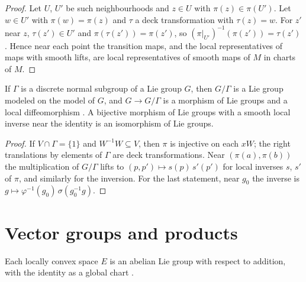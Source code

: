 \begin{proof}
  \leanok
  Let $U$, $U'$ be such neighbourhoods and $z \in U$ with $\pi(z) \in \pi(U')$. Let $w \in U'$ with
  $\pi(w) = \pi(z)$ and $\tau$ a deck transformation with $\tau(z) = w$. For $z'$ near $z$,
  $\tau(z') \in U'$ and $\pi(\tau(z')) = \pi(z')$, so $(\pi|_{U'})^{-1}(\pi(z')) = \tau(z')$.
  Hence near each point the transition maps, and the local representatives of maps with smooth
  lifts, are local representatives of smooth maps of $M$ in charts of $M$.
\end{proof}

\begin{theorem}
  \label{thm:quotient-lie}
  \leanok
  If $\Gamma$ is a discrete normal subgroup of a Lie group $G$, then $G/\Gamma$ is a Lie group
  modeled on the model of $G$, and $G \to G/\Gamma$ is a morphism of Lie groups and a local
  diffeomorphism \cite[Corollary 5.3.4]{GN26}. A bijective morphism of Lie groups with a smooth
  local inverse near the identity is an isomorphism of Lie groups.
\end{theorem}

\begin{proof}
  \leanok
  If $V \cap \Gamma = \{1\}$ and $W^{-1} W \subseteq V$, then $\pi$ is injective on each $xW$; the
  right translations by elements of $\Gamma$ are deck transformations. Near $(\pi(a), \pi(b))$ the
  multiplication of $G/\Gamma$ lifts to $(p, p') \mapsto s(p)\,s'(p')$ for local inverses $s$, $s'$
  of $\pi$, and similarly for the inversion. For the last statement, near $g_0$ the inverse is
  $g \mapsto \varphi^{-1}(g_0)\,\sigma(g_0^{-1} g)$.
\end{proof}

\section{Vector groups and products}

\begin{proposition}
  \label{prop:vector-group}
  \leanok
  Each locally convex space $E$ is an abelian Lie group with respect to addition, with the
  identity as a global chart \cite[Example 5.1.2]{GN26}.
\end{proposition}

